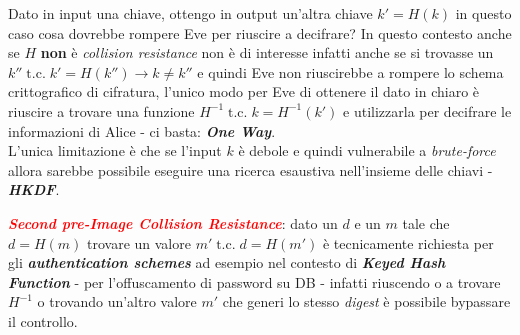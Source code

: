 \begin{flushleft}
    Dato in input una chiave, ottengo in output un'altra chiave $k' = H(k)$ in questo caso cosa dovrebbe rompere Eve per riuscire a decifrare? In questo contesto anche se $H$ \textbf{non} è \textit{collision resistance} non è di interesse infatti anche se si trovasse un $k'' \; \text{t.c.} \; k' = H(k'') \rightarrow k \neq k''$ e quindi Eve non riuscirebbe a rompere lo schema crittografico di cifratura, l'unico modo per Eve di ottenere il dato in chiaro è riuscire a trovare una funzione $H^{-1} \; \text{t.c.} \; k = H^{-1}(k')$ e utilizzarla per decifrare le informazioni di Alice - ci basta: \textbf{\textit{One Way}}. \\
    L'unica limitazione è che se l'input $k$ è debole e quindi vulnerabile a \textit{brute-force} allora sarebbe possibile eseguire una ricerca esaustiva nell'insieme delle chiavi - \textbf{\textit{HKDF}}.

    \medskip

    \textcolor{red}{\textbf{\textit{Second pre-Image Collision Resistance}}}: dato un $d$ e un $m$ tale che $d = H(m)$ trovare un valore $m' \; \text{t.c.} \; d = H(m')$ è tecnicamente richiesta per gli \textbf{\textit{authentication schemes}} ad esempio nel contesto di \textbf{\textit{Keyed Hash Function}} - per l'offuscamento di password su DB - infatti riuscendo o a trovare $H^{-1}$ o trovando un'altro valore $m'$ che generi lo stesso \textit{digest} è possibile bypassare il controllo.
\end{flushleft}

